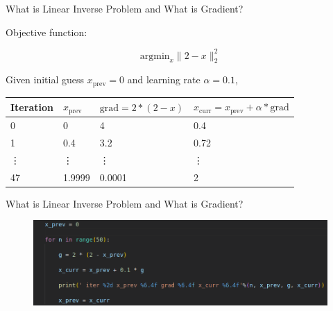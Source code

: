 \begin{frame}{What is Linear Inverse Problem and What is Gradient?}
	
	Objective function:
	
	\begin{equation}
		\mathrm{argmin}_x \lVert 2 - x \rVert_2^2
	\end{equation}

	\vfill

	Given initial guess $x_\mathrm{prev} = 0$ and learning rate $\alpha = 0.1$,
	
	\begin{table}
		\centering
		\begin{tabular}{p{} p{} p{} p{}}
			\toprule
			Iteration & $x_\mathrm{prev}$ & $\mathrm{grad} = 2 * (2 - x)$ & $x_\mathrm{curr} = x_\mathrm{prev} + \alpha * \mathrm{grad}$ \\
			\midrule
			0 & 0 & 4 & 0.4 \\
			1 & 0.4 & 3.2 & 0.72 \\
			\vdots & \vdots & \vdots & \vdots \\
			47 & 1.9999 & 0.0001 & 2 \\
			\bottomrule
		\end{tabular}
	\end{table}
	
\end{frame}


\begin{frame}{What is Linear Inverse Problem and What is Gradient?}
	
	\begin{figure}
		\includegraphics[width=\textwidth]{fig/gradient.png}
	\end{figure}
	
\end{frame}


